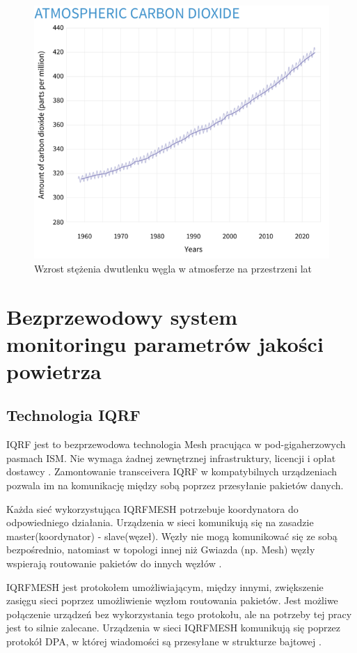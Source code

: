 \documentclass[a4paper, 12pt]{article}
\begin{document}
\begin{figure}
    \includegraphics[width=\textwidth]{zdj/more-co2.png}
    \caption{Wzrost stężenia dwutlenku węgla w atmosferze na przestrzeni lat}
\end{figure}

\section{Bezprzewodowy system monitoringu parametrów jakości powietrza}

\subsection{Technologia IQRF}

IQRF jest to bezprzewodowa technologia Mesh pracująca w pod-gigaherzowych pasmach ISM. Nie wymaga żadnej zewnętrznej infrastruktury, 
licencji i opłat dostawcy \cite{what-iqrf}. Zamontowanie transceivera IQRF w kompatybilnych urządzeniach pozwala im na komunikację między sobą
poprzez przesyłanie pakietów danych. 

Każda sieć wykorzystująca IQRFMESH potrzebuje koordynatora do odpowiedniego działania. Urządzenia w sieci komunikują się na zasadzie
master(koordynator) - slave(węzeł). Węzły nie mogą komunikować się ze sobą bezpośrednio, natomiast w topologi innej niż
Gwiazda (np. Mesh) węzły wspierają routowanie pakietów do innych węzłów \cite{iqrf-rules}.

IQRFMESH jest protokołem umożliwiającym, między innymi, zwiększenie zasięgu sieci poprzez umożliwienie węzłom routowania pakietów.
Jest możliwe połączenie urządzeń bez wykorzystania tego protokołu, ale na potrzeby tej pracy jest to silnie zalecane. \cite{iqrfmesh} Urządzenia w 
sieci IQRFMESH komunikują się poprzez protokół DPA, w której wiadomości są przesyłane w strukturze bajtowej \cite{dpa-guide}.
\end{document}
